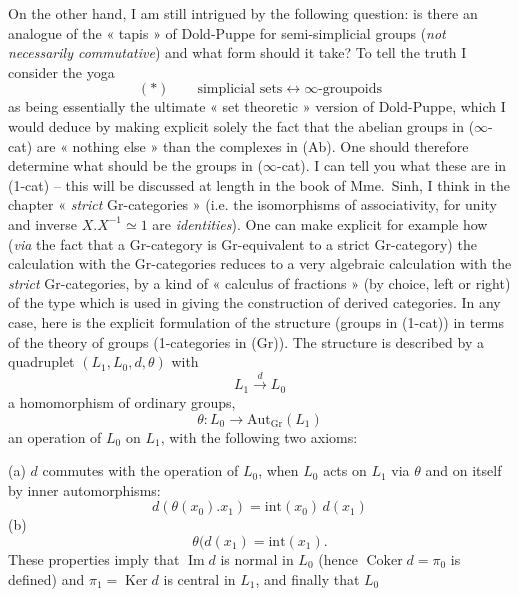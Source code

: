 \documentclass[11pt,a4paper]{article}
\begin{document}
On the other hand, I am still intrigued by the following question: is there an analogue of the « tapis » of Dold-Puppe for semi-simplicial groups (\emph{not necessarily commutative}) and what form should it take? To tell the truth I consider the yoga
\[
(*) \qquad \text{simplicial sets} \longleftrightarrow \infty\text{-groupoids}
\]
as being essentially the ultimate « set theoretic » version of Dold-Puppe, which I would deduce  by making explicit solely the fact that the abelian groups in ($\infty$-cat) are « nothing else » than the  complexes  in (Ab). One should therefore  determine what should be the groups in ($\infty$-cat). I can tell you what these are in (1-cat) -- this will be discussed at length in the book of Mme.~Sinh, I think in the chapter « \emph{strict} Gr-categories » (i.e. the isomorphisms of associativity, for unity and inverse $X.X^{-1} \simeq 1$ are \emph{identities}). One can make explicit for example how (\emph{via} the fact that a Gr-category is Gr-equivalent to a strict Gr-category) the calculation with the Gr-categories reduces to a very algebraic calculation with the \emph{strict} Gr-categories, by a kind of « calculus of fractions » (by choice, left or right) of the type which is used in giving the construction of derived categories. In any case, here is the explicit formulation of the structure (groups in (1-cat)) in terms of the theory of groups (1-categories in (Gr)). The structure is described by a quadruplet $(L_1, L_0, d, \theta)$ with
\[
L_1 \xrightarrow{d} L_0
\]
a homomorphism of ordinary groups,
\[
\theta\colon L_0 \to \mathrm{Aut}_{\mathrm{Gr}}(L_1)
\]
an operation of $L_0$ on $L_1$, with the following two axioms:

(a) $d$ commutes with the operation of $L_0$, when $L_0$ acts on $L_1$ via $\theta$ and on itself by inner automorphisms:
\[
d(\theta(x_0).x_1) = \mathrm{int}(x_0)\, d(x_1)
\]
(b)
\[
\theta(d(x_1) = \mathrm{int}(x_1) .
\]
These properties imply that $\operatorname{Im} d$ is normal in $L_0$ (hence $\operatorname{Coker} d = \pi_0$ is defined) and $\pi_1 = \operatorname{Ker} d$ is central in $L_1$, and finally that $L_0$
\end{document}
